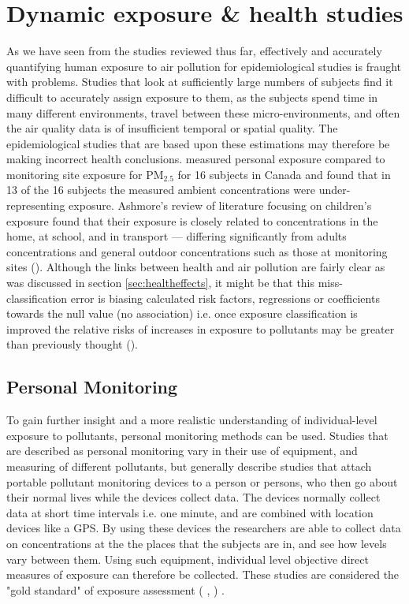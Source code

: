 \newpage
\section{Dynamic exposure \& health studies}
\label{sec:dynamicexposurehealth}

As we have seen from the studies reviewed thus far, effectively and accurately quantifying human exposure to air pollution for epidemiological studies is fraught with problems. Studies that look at sufficiently large numbers of subjects find it difficult to accurately assign exposure to them, as the subjects spend time in many different environments, travel between these micro-environments, and often the air quality data is of insufficient temporal or spatial quality. The epidemiological studies that are based upon these estimations may therefore be making incorrect health conclusions. \cite{Brauer2002} measured personal exposure compared to monitoring site exposure for PM$_{2.5}$ for 16 subjects in Canada and found that in 13 of the 16 subjects the measured ambient concentrations were under-representing exposure. Ashmore's review of literature focusing on children's exposure found that their exposure is closely related to concentrations in the home, at school, and in transport --- differing significantly from adults concentrations and general outdoor concentrations such as those at monitoring sites (\cite{Ashmore2009}). Although the links between health and air pollution are fairly clear as was discussed in section \ref{sec:healtheffects}, it might be that this miss-classification error is biasing calculated risk factors, regressions or coefficients towards the null value (no association) i.e. once exposure classification is improved the relative risks of increases in exposure to pollutants may be greater than previously thought (\cite{Armstrong1990}).


\subsection{Personal Monitoring}
\label{sec:personal_monitoring}

To gain further insight and a more realistic understanding of individual-level exposure to pollutants, personal monitoring methods can be used. Studies that are described as personal monitoring vary in their use of equipment, and measuring of different pollutants, but generally describe studies that attach portable pollutant monitoring devices to a person or persons, who then go about their normal lives while the devices collect data. The devices normally collect data at short time intervals i.e. one minute, and are combined with location devices like a GPS. By using these devices the researchers are able to collect data on concentrations at the the places that the subjects are in, and see how levels vary between them. Using such equipment, individual level objective direct measures of exposure can therefore be collected. These studies are considered the "gold standard" of exposure assessment (\cite{Ashworth2013} , \cite{DeNazelle2008}) .

